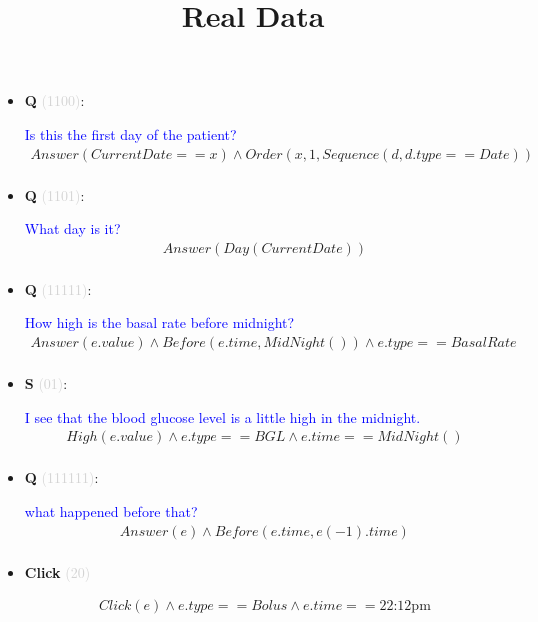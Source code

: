 \documentclass[11pt]{article}
\newcounter{CQ}
\newcounter{CS}
\newcounter{CClick}
\newcommand{\key}[1]{\textcolor{lightgray}{#1}}
\begin{document}
\date{}
\title{Real Data}
\maketitle


\setcounter{CQ}{1}
\setcounter{CS}{1}
\setcounter{CClick}{1}

\begin{itemize}
	\item 
	\textbf{Q\theCQ} \key{(1100)}: \addtocounter{CQ}{1}
	\textcolor{blue}{ Is this the first day of the patient? }
	\begin{multline*}
	Answer(CurrentDate==x) \wedge Order(x, 1, Sequence(d, d.type==Date)) \\
	\end{multline*}
	
	
	\item 
	\textbf{Q\theCQ} \key{(1101)}:  \addtocounter{CQ}{1}
	\textcolor{blue}{ What day is it? }
	\begin{multline*}
	Answer(Day(CurrentDate)) \\
	\end{multline*}
	
	
	\item 
	\textbf{Q\theCQ} \key{(11111)}: \addtocounter{CQ}{1}
	\textcolor{blue}{ How high is the basal rate before midnight? }
	\begin{multline*}
	Answer(e.value) \wedge Before(e.time, MidNight()) \wedge e.type==BasalRate \\
	\end{multline*}
	
	
	\item
	\textbf{S\theCS} \key{(01)}: \addtocounter{CS}{1}
	\textcolor{blue}{ I see that the blood glucose level is a little high in the midnight. }
	\begin{multline*}
	High(e.value) \wedge e.type==BGL \wedge e.time==MidNight()\\
	\end{multline*}
	
	
	\item
	\textbf{Q\theCQ} \key{(111111)}: \addtocounter{CQ}{1}
	\textcolor{blue}{ what happened before that? }
	\begin{multline*}
	Answer(e) \wedge Before(e.time, e(-1).time) \\
	\end{multline*}
	
	
	\item
	\textbf{Click\theCClick} \key{(20)} \addtocounter{CClick}{1}
	\begin{multline*}
	Click(e) \wedge e.type == Bolus \wedge e.time == \mbox{22:12pm} \\
	\end{multline*}
	

\end{itemize}
\end{document}
